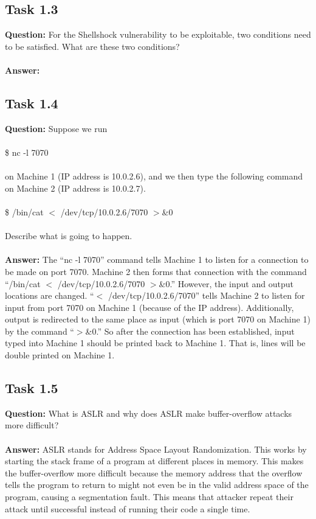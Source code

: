 \documentclass[11pt]{article}
\begin{document}
\subsection*{Task 1.3}

\textbf{Question: } For the Shellshock vulnerability to be exploitable, two conditions need to be satisfied. What are these two conditions? \\\\
\textbf{Answer: }

\subsection*{Task 1.4}

\textbf{Question: } Suppose we run \\\\
\indent \$ nc -l 7070 \\\\
on Machine 1 (IP address is 10.0.2.6), and we then type the following command on Machine 2 (IP address is 10.0.2.7). \\\\
\indent \$ /bin/cat $<$ /dev/tcp/10.0.2.6/7070 $>$\&0 \\\\
Describe what is going to happen. \\\\
\textbf{Answer: } The ``nc -l 7070'' command tells Machine 1 to listen for a connection to be made on port 7070. Machine 2 then forms that connection with the command ``/bin/cat $<$ /dev/tcp/10.0.2.6/7070 $>$\&0.'' However, the input and output locations are changed. ``$<$ /dev/tcp/10.0.2.6/7070'' tells Machine 2 to listen for input from port 7070 on Machine 1 (because of the IP address). Additionally, output is redirected to the same place as input (which is port 7070 on Machine 1) by the command ``$>$\&0.'' So after the connection has been established, input typed into Machine 1 should be printed back to Machine 1. That is, lines will be double printed on Machine 1.

\subsection*{Task 1.5}

\textbf{Question: } What is ASLR and why does ASLR make buffer-overflow attacks more difficult? \\\\
\textbf{Answer: } ASLR stands for Address Space Layout Randomization. This works by starting the stack frame of a program at different places in memory. This makes the buffer-overflow more difficult because the memory address that the overflow tells the program to return to might not even be in the valid address space of the program, causing a segmentation fault. This means that attacker repeat their attack until successful instead of running their code a single time.
\end{document}

